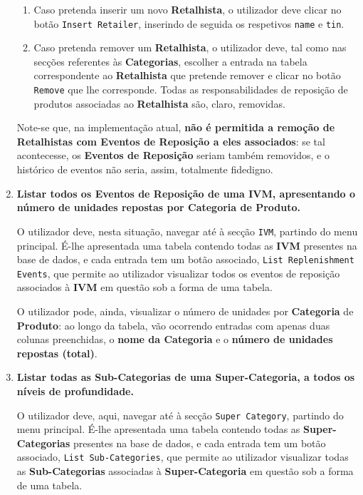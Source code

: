 \documentclass[12pt,a4paper]{article}
\begin{document}
\begin{enumerate}
    \begin{enumerate}
      \item Caso pretenda inserir um novo \textbf{Retalhista}, o utilizador
      deve clicar no botão \texttt{Insert Retailer}, inserindo de seguida os respetivos
      \texttt{name} e \texttt{tin}.

      \item Caso pretenda remover um \textbf{Retalhista}, o utilizador deve, tal
      como nas secções referentes às \textbf{Categorias}, escolher a entrada na
      tabela correspondente ao \textbf{Retalhista} que pretende remover e clicar
      no botão \texttt{Remove} que lhe corresponde. Todas as responsabilidades
      de reposição de produtos associadas ao \textbf{Retalhista} são, claro, removidas.
    \end{enumerate}

    Note-se que, na implementação atual, \textbf{não é permitida a remoção de Retalhistas
    com Eventos de Reposição a eles associados}: se tal acontecesse, os \textbf{Eventos
    de Reposição} seriam também removidos, e o histórico de eventos não seria, assim,
    totalmente fidedigno.
    
    \item \textbf{Listar todos os Eventos de Reposição de uma IVM, apresentando
    o número de unidades repostas por Categoria de Produto.}

    O utilizador deve, nesta situação, navegar até à secção \texttt{IVM},
    partindo do menu principal. É-lhe apresentada uma tabela contendo todas as
    \textbf{IVM} presentes na base de dados, e cada entrada tem um botão
    associado, \texttt{List Replenishment Events}, que permite ao utilizador
    visualizar todos os eventos de reposição associados à \textbf{IVM} em questão
    sob a forma de uma tabela.
    
    O utilizador pode, ainda, visualizar o número
    de unidades por \textbf{Categoria} de \textbf{Produto}: ao longo da tabela,
    vão ocorrendo entradas com apenas duas colunas preenchidas, o \textbf{nome
    da Categoria} e o \textbf{número de unidades repostas (total)}.
    
    \item \textbf{Listar todas as Sub-Categorias de uma Super-Categoria, a todos
    os níveis de profundidade.}

    O utilizador deve, aqui, navegar até à secção \texttt{Super Category},
    partindo do menu principal. É-lhe apresentada uma tabela contendo todas as
    \textbf{Super-Categorias} presentes na base de dados, e cada entrada tem um
    botão associado, \texttt{List Sub-Categories}, que permite ao utilizador
    visualizar todas as \textbf{Sub-Categorias} associadas à \textbf{Super-Categoria}
    em questão sob a forma de uma tabela.
    

\end{enumerate}
\end{document}
